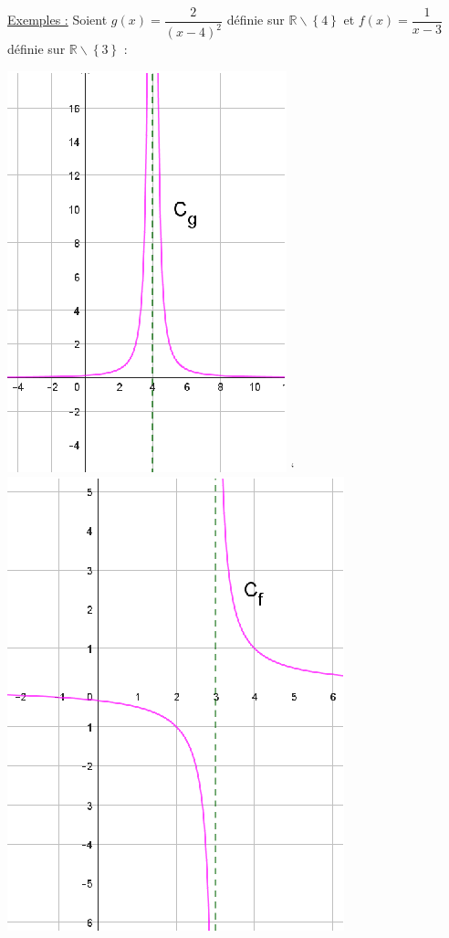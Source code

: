 \documentclass[a4paper,12pt,twoside,french]{extarticle}
\newcommand{\R}{\ensuremath{\mathbb{R}}\xspace}
\begin{document}
\underline{Exemples :} Soient  $g(x)=\dfrac{2}{(x-4)^2}$ définie sur $\R\backslash\left\lbrace4\right\rbrace$  et $f(x)=\dfrac{1}{x-3}$ définie sur $\R\backslash\left\lbrace3\right\rbrace$ :\\

\vspace*{0.25cm}

\includegraphics[scale=1.8]{asymptverti2.eps} `\hspace*{0.5cm} \includegraphics[scale=1.7]{asymptverti1.eps}
\end{document}
